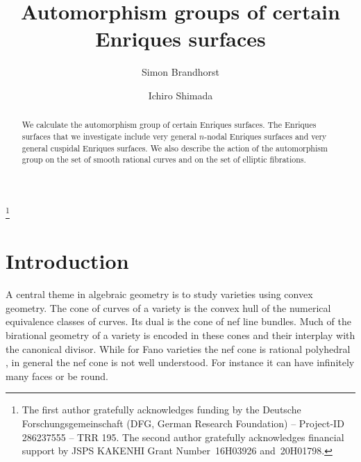 \documentclass{amsart}
\numberwithin{procedure}{section}
\begin{document}
\title[Automorphism groups of  Enriques surfaces]
{Automorphism groups of  certain Enriques surfaces}

\author[S. Brandhorst]{Simon Brandhorst}
\address{Fachbereich Mathematik, Saarland University,
Campus E2.4, 66123 Saarbr\"ucken, Germany}



\author[I. Shimada]{Ichiro Shimada}
\address{Department of Mathematics, Graduate School of Science, Hiroshima University,
1-3-1 Kagamiyama, Higashi-Hiroshima, 739-8526 JAPAN}
\thanks{The first author gratefully acknowledges funding by the Deutsche Forschungsgemeinschaft (DFG, German Research Foundation) – Project-ID 286237555 – TRR 195.
The second author gratefully acknowledges financial support by JSPS KAKENHI Grant Number~16H03926 and~20H01798.}


\begin{abstract}
We calculate 
the automorphism group of certain Enriques surfaces.
The Enriques surfaces that we investigate 
include very general $n$-nodal Enriques surfaces
and very general cuspidal Enriques surfaces.
We also describe the action of the automorphism group
on the set of smooth rational curves
and on the set of elliptic fibrations.
\end{abstract}
%


\maketitle
%
%
\section{Introduction}\label{sec:Introduction}
%
A central theme in algebraic geometry is to study varieties using
convex geometry. The cone of curves of a variety is the convex hull of
the numerical equivalence classes of curves. 
Its dual is the cone of nef line bundles. 
Much of the birational geometry of a variety is encoded in these cones and their interplay with the canonical divisor.
While for Fano varieties the nef cone is rational polyhedral \cite[Theorem 3.7]{morikollar1998},
in general the nef cone is not well understood. For instance it can have infinitely many faces or be round.
\end{document}
